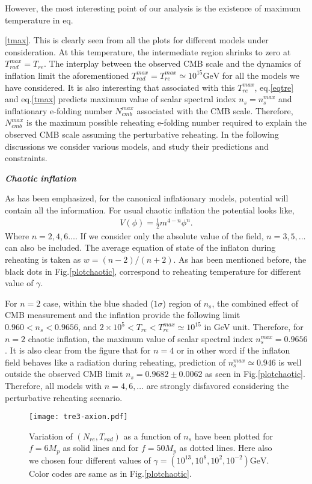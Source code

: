 \documentclass[prl,twocolumn,superscriptaddress,doublespace]{revtex4}%
\def\bea{\begin{eqnarray}}
\def\eea{\end{eqnarray}}
\begin{document}
 However, the most interesting point of our analysis is the existence of maximum temperature in eq.{\ref{tmax}. This is clearly seen from all the plots for different models under consideration. At this temperature, the intermediate region shrinks to zero at $T^{max}_{rad} = T_{re}$. The interplay between the observed CMB scale and the dynamics of inflation limit the aforementioned $T^{max}_{rad} = T^{max}_{re} \simeq 10^{15} \mbox{GeV}$ for all the models we have considered. It is also interesting that associated with this $T_{re}^{max}$, eq.\ref{eqtre} and eq.\ref{tmax} predicts maximum value of scalar spectral index $n_s = n_s^{max}$ and inflationary e-folding number $N^{max}_{cmb}$ associated with the CMB scale. 
Therefore, $N_{cmb}^{max}$ is the maximum possible reheating e-folding number required to explain the observed CMB scale assuming the perturbative reheating. In the following discussions we consider various models, and study their predictions and constraints. 


  
\vskip 0.2cm
\textbf {\textit {Chaotic }}\cite{chaotic}\textbf{\textit{inflation}}

As has been emphasized, for the canonical inflationary models, potential will contain all the information. For usual chaotic inflation the potential looks like, 
\bea
V(\phi)= \frac 1 2 m^{4-n} \phi^n.
\eea
Where $n = 2,4,6 \dots$. If we consider only the absolute value of the field, $n=3,5,\dots$ can also be included. The average equation of state of the inflaton during reheating is taken as $w = (n-2)/(n+2)$. As has been mentioned before, the black dots in Fig.\ref{plotchaotic}, correspond to reheating temperature for different value of $\gamma$. 

For $n=2$ case, within the blue shaded ($1 \sigma$) region of $n_s$, the combined effect of CMB measurement and the inflation provide the following limit $0.960 < n_s < 0.9656$, and $ 2\times 10^5 < T_{re} < T_{re}^{max} \simeq 10^{15} $ in GeV unit. Therefore, for $n=2$ chaotic inflation, the maximum value of scalar spectral index $n_s^{max} = 0.9656$. It is also clear from the figure that for $n=4$ or in other word if the inflaton field behaves like a radiation during reheating, prediction of $n_s^{max} \simeq 0.946$ is well outside the observed CMB limit $n_s = 0.9682 \pm 0.0062$ as seen in Fig.\ref{plotchaotic}. Therefore, all models with $n=4,6,\dots$ are strongly disfavored considering the perturbative reheating scenario. 

\begin{figure}
	\begin{center}
		\texttt{[image: tre3-axion.pdf]}
		\caption{\scriptsize Variation of $(N_{re},T_{rad})$ as a function of $n_s$ have been plotted for $f = 6 M_p$ as solid lines and for $f= 50 M_p$ as dotted lines. Here also we chosen four different values of $ \gamma = (10^{13},10^8, 10^2, 10^{-2})  \mbox{GeV}$. Color codes are same as in Fig.\ref{plotchaotic}.} 
		\label{plotnatural}
	\end{center}
\end{figure}
 
}
\end{document}

